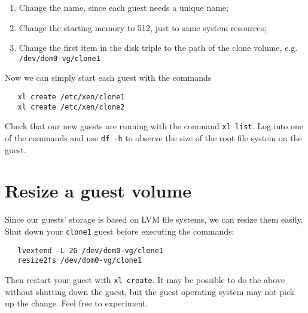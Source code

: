 \documentclass{article}
\begin{document}
\begin{enumerate}
  \item Change the name, since each guest needs a unique name;
  \item Change the starting memory to 512, just to same system resources;
  \item Change the first item in the disk triple to the path of the clone volume, e.g. \texttt{/dev/dom0-vg/clone1}
 \end{enumerate}
 
 Now we can simply start each guest with the commands
 
 \begin{verbatim}
   xl create /etc/xen/clone1
   xl create /etc/xen/clone2
 \end{verbatim}
 
 Check that our new guests are running with the command \texttt{xl list}. Log into one of the commands and use \texttt{df -h} to observe the size of the root file system on the guest. 
 
 \section{Resize a guest volume} 
 Since our guests' storage is based on LVM file systems, we can resize them easily. Shut down your \texttt{clone1} guest before executing the commands:
 
 \begin{verbatim}
   lvextend -L 2G /dev/dom0-vg/clone1
   resize2fs /dev/dom0-vg/clone1
  \end{verbatim}
  
  Then restart your guest with \texttt{xl create}. It may be possible to do the above without shutting down the guest, but the guest operating system may not pick up the change. Feel free to experiment.
\end{document}
